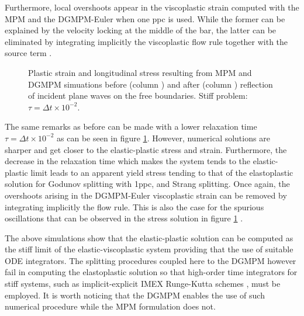 Furthermore, local overshoots appear in the viscoplastic strain computed with the MPM and the DGMPM-Euler when one ppc is used. While the former can be explained by the velocity locking at the middle of the bar, the latter can be eliminated by integrating implicitly the viscoplastic flow rule together with the source term \cite{Thomas_EVP}.
\begin{figure}[h!]
  \centering
  { \label{subfig:evp_stiff1}}
  { \label{subfig:evp_stiff3}}
  {}
  \caption{Plastic strain and longitudinal stress resulting from MPM and DGMPM simuations before (column ) and after (column ) reflection of incident plane waves on the free boundaries. Stiff problem: $\tau=\Delta t \times 10^{-2}$.}
  \label{fig:siff_elastoviscoplastic_RP}
\end{figure}

The same remarks as before can be made with a lower relaxation time $\tau=\Delta t \times 10^{-2}$ as can be seen in figure \ref{fig:siff_elastoviscoplastic_RP}. However, numerical solutions are sharper and get closer to the elastic-plastic stress and strain. Furthermore, the decrease in the relaxation time which makes the system tends to the elastic-plastic limit leads to an apparent yield stress tending to that of the elastoplastic solution for Godunov splitting with 1ppc, and Strang splitting.
Once again, the overshoots arising in the DGMPM-Euler viscoplastic strain can be removed by integrating implicitly the flow rule. This is also the case for the spurious oscillations that can be observed in the stress solution in figure \ref{fig:siff_elastoviscoplastic_RP} \cite{Thomas_EVP}. 

The above simulations show that the elastic-plastic solution can be computed as the stiff limit of the elastic-viscoplastic system providing that the use of suitable ODE integrators. 
The splitting procedures coupled here to the DGMPM however fail in computing the elastoplastic solution so that high-order time integrators for stiff systems, such as implicit-explicit IMEX Runge-Kutta schemes \cite{Pareschi_stiff}, must be employed. It is worth noticing that the DGMPM enables the use of such numerical procedure while the MPM formulation does not.


